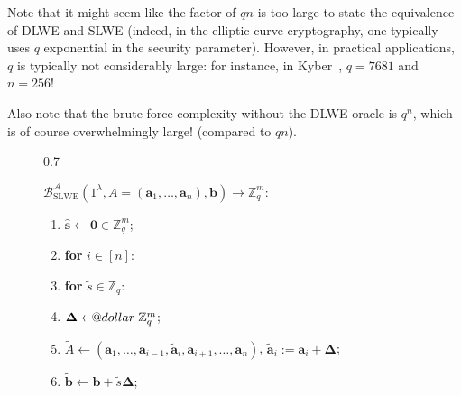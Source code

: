 \documentclass{template}
\makeatletter
\newcommand\leftarrowS{\leftarrow\joinrel\smalldollar}
\newcommand{\smalldollar}{\mathrel{\mathpalette\small@dollar\relax}}
\newcommand{\small@dollar}[2]{%
  \vcenter{\hbox{%
    $#1\textnormal{\fontsize{0.7\dimexpr\f@size pt}{0}\selectfont\$}$%
  }}%
}
\makeatother
\begin{document}
\begin{remark}
    Note that it might seem like the factor of $qn$ is too large to state the
    equivalence of DLWE and SLWE (indeed, in the elliptic curve cryptography,
    one typically uses $q$ exponential in the security parameter). However, in practical
    applications, $q$ is typically not considerably large: for instance, in
    Kyber~\cite{kyber}, $q=7681$ and $n=256$!

    Also note that the brute-force complexity without the DLWE oracle is $q^n$,
    which is of course overwhelmingly large! (compared to $qn$).
\end{remark}

\begin{figure}[ht]
\centering
\begin{varwidth}{0.7\linewidth}
\begin{mdframed}[linecolor=black,
                 linewidth=1.0pt,
                 skipabove=10pt,
                 skipbelow=10pt,
                 leftmargin=0pt,
                 rightmargin=0pt]
\colorbox{purple!10}{\underline{$\mathcal{B}^{\mathcal{A}}_{\text{SLWE}}(1^{\lambda}, A=(\mathbf{a}_1,\dots,\mathbf{a}_n), \mathbf{b}) \to \mathbb{Z}_q^{m}$:}}
\begin{enumerate}
    \item $\widehat{\mathbf{s}} \gets \mathbf{0} \in \mathbb{Z}_q^m$;
    \item \textbf{for} $i \in [n]$:
    \item \hspace{10px} \textbf{for} $\widetilde{s} \in \mathbb{Z}_q$:
    \item \hspace{20px} $\boldsymbol{\Delta} \leftarrowS \mathbb{Z}_q^m$;
    \item \hspace{20px} $\widetilde{A} \gets (\mathbf{a}_1,\dots,\mathbf{a}_{i-1},\widetilde{\mathbf{a}}_i, \mathbf{a}_{i+1},\dots,\mathbf{a}_n)$, $\widetilde{\mathbf{a}}_i := \mathbf{a}_i+\boldsymbol{\Delta}$;
    \item \hspace{20px} $\widetilde{\mathbf{b}} \gets \mathbf{b} + \widetilde{s}\boldsymbol{\Delta}$;

\end{enumerate}
\end{mdframed}
\end{varwidth}
\end{figure}
\end{document}
